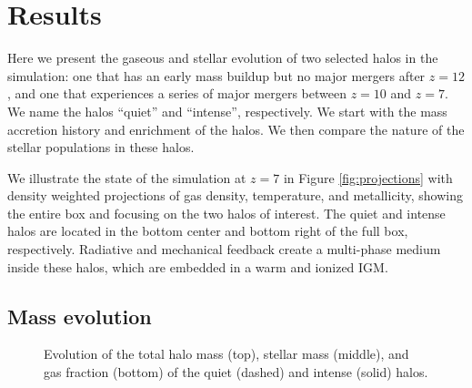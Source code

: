 \documentclass[apjl]{emulateapj}
\begin{document}
\section{Results}
\label{sec:results}

\begin{figure*}
  \caption{\label{fig:projections} Density-weighted projections of gas
    density (top), temperature (middle), and metallicity (bottom) at
    $z=7$.  The left column shows the entire simulation volume, where
    the center and right columns focus on the intense and quiet halos.
    The metallicity projections are a composite picture of metals
    originating from Pop III (red) and Pop II (blue) stars with purple
    indicating a mixture of the two.}
\end{figure*}

Here we present the gaseous and stellar evolution of two selected
halos in the simulation: one that has an early mass buildup but no
major mergers after $z=12$, and one that experiences a series of major
mergers between $z=10$ and $z=7$.  We name the halos ``quiet'' and
``intense'', respectively.  We start with the mass accretion history
and enrichment of the halos.  We then compare the nature of the
stellar populations in these halos.

We illustrate the state of the simulation at $z=7$ in Figure
\ref{fig:projections} with density weighted projections of gas
density, temperature, and metallicity, showing the entire box and
focusing on the two halos of interest.  The quiet and intense halos
are located in the bottom center and bottom right of the full box,
respectively.  Radiative and mechanical feedback create a multi-phase
medium inside these halos, which are embedded in a warm and ionized
IGM.

\subsection{Mass evolution}
\label{sec:halo}

\begin{figure}
  \caption{\label{fig:evo} Evolution of the total halo mass (top),
    stellar mass (middle), and gas fraction (bottom) of the quiet
    (dashed) and intense (solid) halos.}
\end{figure}

\end{document}
